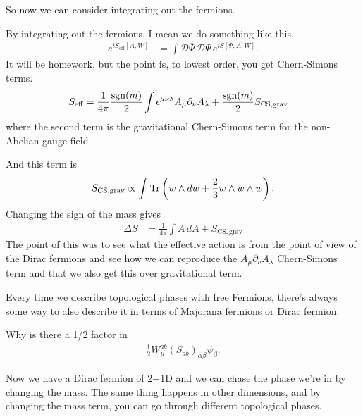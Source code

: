 So now we can consider integrating out the fermions.

By integrating out the fermions,
I mean we do something like this.
\begin{align}
    e^{iS_{\mathrm{eff}}[A,W]} &=
    \int \mathcal{D}\overline{\Psi}\,\mathcal{D}\Psi\,
    e^{iS[\Psi, A, W]}.
\end{align}
It will be homework,
but the point  is,
to lowest order,
you get Chern-Simons terms.
\begin{align}
    S_{\mathrm{eff}} &=
    \frac{1}{4\pi} \frac{\operatorname{sgn}(m)}{2}
    \int \epsilon^{\mu\nu\lambda} A_\mu \partial_\nu A_\lambda
    + \frac{\operatorname{sgn}(m)}{2} S_{\mathrm{CS,grav}}
\end{align}
where the second term is the gravitational Chern-Simons term for the non-Abelian
gauge field.

And this term is
\begin{align}
    S_{\mathrm{CS,grav}} \propto
    \int\Tr\left( w\wedge dw + \frac{2}{3} w\wedge w \wedge w \right).
\end{align}
Changing the sign of the mass gives
\begin{align}
    \Delta S &= \frac{1}{4\pi} \int A\, dA
    + S_{\mathrm{CS,grav}}
\end{align}
The point of this was to see what the effective action is from the point of view
of the Dirac fermions and see how we can reproduce the
$A_\mu \partial_\nu A_\lambda$
Chern-Simons term and that we also get this over gravitational term.

Every time we describe topological phases with free Fermions,
there's always some way to also describe it in terms of Majorana fermions
or Dirac fermion.

\begin{question}
    Why is there a 1/2 factor in
    \begin{align}
        \frac{1}{2}W_\mu^{ab} \left( S_{ab} \right)_{\alpha\beta}\psi_\beta.
    \end{align}
\end{question}

Now we have a Dirac fermion of 2+1D and we can chase the phase we're in by
changing the mass.
The same thing happens in other dimensions,
and by changing the mass term,
you can go through different topological phases.

